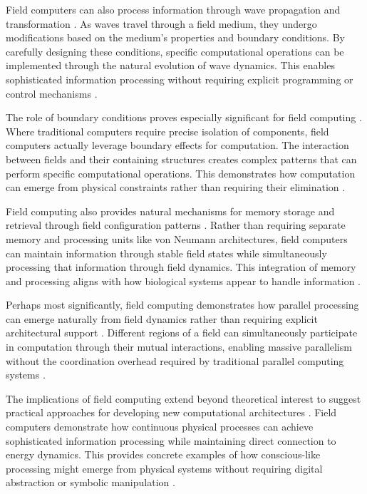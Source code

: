 \begin{refsection}
Field computers can also process information through wave propagation and transformation \cite{Chua2017}. As waves travel through a field medium, they undergo modifications based on the medium's properties and boundary conditions. By carefully designing these conditions, specific computational operations can be implemented through the natural evolution of wave dynamics. This enables sophisticated information processing without requiring explicit programming or control mechanisms \cite{Fromherz2019}.

The role of boundary conditions proves especially significant for field computing \cite{Haken2020}. Where traditional computers require precise isolation of components, field computers actually leverage boundary effects for computation. The interaction between fields and their containing structures creates complex patterns that can perform specific computational operations. This demonstrates how computation can emerge from physical constraints rather than requiring their elimination \cite{McFadden2018}.

Field computing also provides natural mechanisms for memory storage and retrieval through field configuration patterns \cite{Nikolic2019}. Rather than requiring separate memory and processing units like von Neumann architectures, field computers can maintain information through stable field states while simultaneously processing that information through field dynamics. This integration of memory and processing aligns with how biological systems appear to handle information \cite{Pockett2021}.

Perhaps most significantly, field computing demonstrates how parallel processing can emerge naturally from field dynamics rather than requiring explicit architectural support \cite{Pribram2017}. Different regions of a field can simultaneously participate in computation through their mutual interactions, enabling massive parallelism without the coordination overhead required by traditional parallel computing systems \cite{Raychowdhury2020}.

The implications of field computing extend beyond theoretical interest to suggest practical approaches for developing new computational architectures \cite{Verschure2019}. Field computers demonstrate how continuous physical processes can achieve sophisticated information processing while maintaining direct connection to energy dynamics. This provides concrete examples of how conscious-like processing might emerge from physical systems without requiring digital abstraction or symbolic manipulation \cite{Werbos2018}.


\end{refsection}

